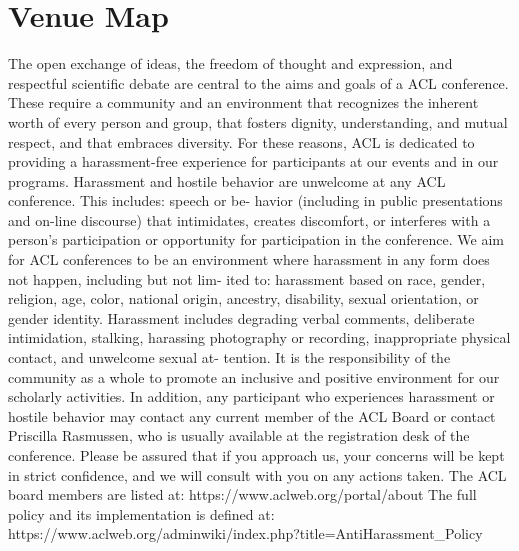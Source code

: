 \chapter{Venue Map}
\vspace*{0.2cm}

The open exchange of ideas, the freedom of thought and expression, and respectful scientific debate are central to the aims and goals of a ACL conference. These require a community and an environment that recognizes the inherent worth of every person and group, that fosters dignity, understanding, and mutual respect, and that embraces diversity. For these reasons, ACL is dedicated to providing a harassment-free experience for participants at our events and in our programs.
Harassment and hostile behavior are unwelcome at any ACL conference. This includes: speech or be- havior (including in public presentations and on-line discourse) that intimidates, creates discomfort, or interferes with a person’s participation or opportunity for participation in the conference. We aim for ACL conferences to be an environment where harassment in any form does not happen, including but not lim- ited to: harassment based on race, gender, religion, age, color, national origin, ancestry, disability, sexual orientation, or gender identity. Harassment includes degrading verbal comments, deliberate intimidation, stalking, harassing photography or recording, inappropriate physical contact, and unwelcome sexual at- tention.
It is the responsibility of the community as a whole to promote an inclusive and positive environment for our scholarly activities. In addition, any participant who experiences harassment or hostile behavior may contact any current member of the ACL Board or contact Priscilla Rasmussen, who is usually available at the registration desk of the conference. Please be assured that if you approach us, your concerns will be kept in strict confidence, and we will consult with you on any actions taken.
The ACL board members are listed at:
https://www.aclweb.org/portal/about
The full policy and its implementation is defined at:
https://www.aclweb.org/adminwiki/index.php?title=Anti\-Harassment\_Policy